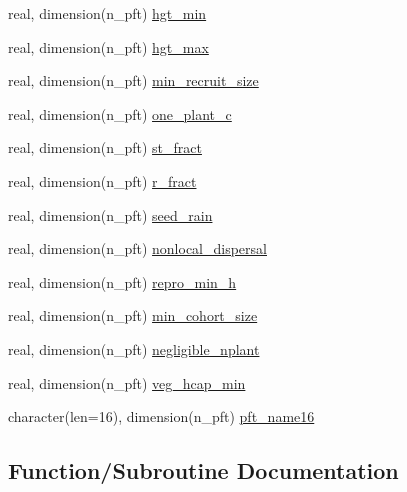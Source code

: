\begin{DoxyCompactItemize}
\item 
real, dimension(n\+\_\+pft) \hyperlink{namespacepft__coms_aab740dc3cca80fdd00440b412f111a74}{hgt\+\_\+min}
\item 
real, dimension(n\+\_\+pft) \hyperlink{namespacepft__coms_a81703797d07f20bd129277ed6a78e30e}{hgt\+\_\+max}
\item 
real, dimension(n\+\_\+pft) \hyperlink{namespacepft__coms_a4a008038dd34f2531f2ca7637c6e74b0}{min\+\_\+recruit\+\_\+size}
\item 
real, dimension(n\+\_\+pft) \hyperlink{namespacepft__coms_a584bfab014a9ec5b4a5d7ed9e458df9f}{one\+\_\+plant\+\_\+c}
\item 
real, dimension(n\+\_\+pft) \hyperlink{namespacepft__coms_a24d6f9401bfd2a1127dbc4b957a6d94e}{st\+\_\+fract}
\item 
real, dimension(n\+\_\+pft) \hyperlink{namespacepft__coms_a588d74ddc11417f923b20d000e0740aa}{r\+\_\+fract}
\item 
real, dimension(n\+\_\+pft) \hyperlink{namespacepft__coms_a9e5f0badf00a834a699115fc8974d9f2}{seed\+\_\+rain}
\item 
real, dimension(n\+\_\+pft) \hyperlink{namespacepft__coms_ab4b143dec3e017f4e90ee99ca12bb329}{nonlocal\+\_\+dispersal}
\item 
real, dimension(n\+\_\+pft) \hyperlink{namespacepft__coms_a30fe0a0ce90033d81e78cc82c9b70017}{repro\+\_\+min\+\_\+h}
\item 
real, dimension(n\+\_\+pft) \hyperlink{namespacepft__coms_ae271b74cd105b2cf539a630a97cfc185}{min\+\_\+cohort\+\_\+size}
\item 
real, dimension(n\+\_\+pft) \hyperlink{namespacepft__coms_a35da186f9b0c1860742f4496333703a7}{negligible\+\_\+nplant}
\item 
real, dimension(n\+\_\+pft) \hyperlink{namespacepft__coms_a0bc569727ea7f49b70751189cb07d8fc}{veg\+\_\+hcap\+\_\+min}
\item 
character(len=16), dimension(n\+\_\+pft) \hyperlink{namespacepft__coms_abbfea830303582f918e1630cb7009694}{pft\+\_\+name16}
\end{DoxyCompactItemize}


\subsection{Function/\+Subroutine Documentation}
